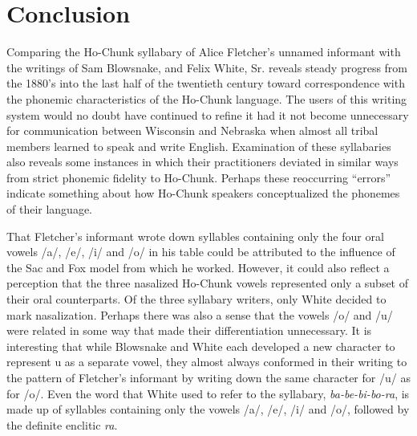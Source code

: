 \documentclass[output=paper]{LSP/langsci}
\begin{document}
\section{Conclusion}

Comparing the Ho-Chunk syllabary of Alice Fletcher's unnamed informant with the writings of Sam Blowsnake, and Felix White, Sr. reveals steady progress from the 1880's into the last half of the twentieth century toward correspondence with the phonemic characteristics of the Ho-Chunk language. The users of this writing system would no doubt have continued to refine it had it not become unnecessary for communication between Wisconsin and Nebraska when almost all tribal members learned to speak and write English. Examination of these syllabaries also reveals some instances in which their practitioners deviated in similar ways from strict phonemic fidelity to Ho-Chunk. Perhaps these reoccurring ``errors'' indicate something about how Ho-Chunk speakers conceptualized the phonemes of their language. 

That Fletcher's informant wrote down syllables containing only the four oral vowels /a/, /e/, /i/ and /o/ in his table could be attributed to the influence of the Sac and Fox model from which he worked. However, it could also reflect a perception that the three nasalized Ho-Chunk vowels represented only a subset of their oral counterparts. Of the three syllabary writers, only White decided to mark nasalization. Perhaps there was also a sense that the vowels /o/ and /u/ were related in some way that made their differentiation unnecessary. It is interesting that while Blowsnake and White each developed a new character to represent u as a separate vowel, they almost always conformed in their writing to the pattern of Fletcher's informant by writing down the same character for /u/ as for /o/. Even the word that White used to refer to the syllabary, \emph{ba-be-bi-bo-ra}, is made up of syllables containing only the vowels /a/, /e/, /i/ and /o/, followed by the definite enclitic \emph{ra}. 
\end{document}
